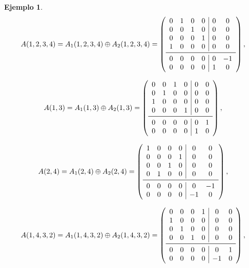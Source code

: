 \documentclass[12pt]{book}
\theoremstyle{definition}
\newtheorem{example}[theorem]{Ejemplo}
\newcounter{in}
\begin{document}
\begin{example}
\[
A(1, 2, 3, 4) = A_{1}(1, 2, 3, 4) \oplus A_{2}(1, 2, 3, 4) =
\left( \begin{array}{cccc|cc}
0 & 1 & 0 & 0 & 0 &  0 \\
0 & 0 & 1 & 0 & 0 &  0 \\
0 & 0 & 0 & 1 & 0 &  0 \\
1 & 0 & 0 & 0 & 0 &  0 \\
\midrule
0 & 0 & 0 & 0 & 0 & -1 \\
0 & 0 & 0 & 0 & 1 &  0 \\
\end{array}\right),
\]

\[
A(1, 3) = A_{1}(1, 3) \oplus A_{2}(1, 3) =
\left( \begin{array}{cccc|cc}
0 & 0 & 1 & 0 & 0 & 0 \\
0 & 1 & 0 & 0 & 0 & 0 \\
1 & 0 & 0 & 0 & 0 & 0 \\
0 & 0 & 0 & 1 & 0 & 0 \\
\midrule
0 & 0 & 0 & 0 & 0 & 1 \\
0 & 0 & 0 & 0 & 1 & 0 \\
\end{array}\right),
\]

\[
A(2, 4) = A_{1}(2, 4) \oplus A_{2}(2, 4) =
\left( \begin{array}{cccc|cc}
1 & 0 & 0 & 0 &  0 &  0 \\
0 & 0 & 0 & 1 &  0 &  0 \\
0 & 0 & 1 & 0 &  0 &  0 \\
0 & 1 & 0 & 0 &  0 &  0 \\
\midrule
0 & 0 & 0 & 0 &  0 & -1 \\
0 & 0 & 0 & 0 & -1 &  0 \\
\end{array}\right),
\]

\[
A(1, 4, 3, 2) = A_{1}(1, 4, 3, 2) \oplus A_{2}(1, 4, 3, 2) =
\left( \begin{array}{cccc|cc}
0 & 0 & 0 & 1 &  0 & 0 \\
1 & 0 & 0 & 0 &  0 & 0 \\
0 & 1 & 0 & 0 &  0 & 0 \\
0 & 0 & 1 & 0 &  0 & 0 \\
\midrule
0 & 0 & 0 & 0 &  0 & 1 \\
0 & 0 & 0 & 0 & -1 & 0 \\
\end{array}\right),
\]


\end{example}
\end{document}
